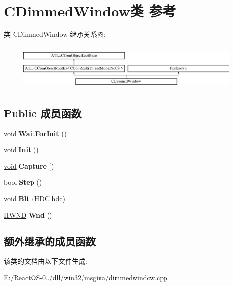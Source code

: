 \hypertarget{class_c_dimmed_window}{}\section{C\+Dimmed\+Window类 参考}
\label{class_c_dimmed_window}
类 C\+Dimmed\+Window 继承关系图\+:\begin{figure}[H]
\begin{center}
\leavevmode
\includegraphics[height=2.386364cm]{class_c_dimmed_window}
\end{center}
\end{figure}
\subsection*{Public 成员函数}
\begin{DoxyCompactItemize}
\item 
\mbox{\label{class_c_dimmed_window_aed4afcae8c356d401e504fd15d4f2e69}} 
\hyperlink{interfacevoid}{void} {\bfseries Wait\+For\+Init} ()
\item 
\mbox{\label{class_c_dimmed_window_a9382ee14c75772293e8e561510ee2bc8}} 
\hyperlink{interfacevoid}{void} {\bfseries Init} ()
\item 
\mbox{\label{class_c_dimmed_window_a849be98f772ed0d153c67fe184c3fbb2}} 
\hyperlink{interfacevoid}{void} {\bfseries Capture} ()
\item 
\mbox{\label{class_c_dimmed_window_abee00917b9606f24b0e5006732dfc8b1}} 
bool {\bfseries Step} ()
\item 
\mbox{\label{class_c_dimmed_window_afabf2dc83e9e15e3b0ff5c47cce8a2cd}} 
\hyperlink{interfacevoid}{void} {\bfseries Blt} (H\+DC hdc)
\item 
\mbox{\label{class_c_dimmed_window_aee398edad596a89aaa69200d86520fae}} 
\hyperlink{interfacevoid}{H\+W\+ND} {\bfseries Wnd} ()
\end{DoxyCompactItemize}
\subsection*{额外继承的成员函数}


该类的文档由以下文件生成\+:\begin{DoxyCompactItemize}
\item 
E\+:/\+React\+O\+S-\/0../dll/win32/msgina/dimmedwindow.\+cpp\end{DoxyCompactItemize}

